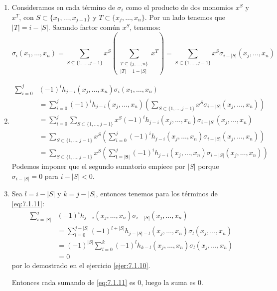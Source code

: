 \documentclass[twoside]{article}
\begin{document}
\begin{solucion}
\mbox{}
\begin{enumerate}
\item Consideramos en cada término de $σ_i$ como el producto de dos monomios $x^S$ y $x^T$, con $S \subset \{x_1,\dots,x_{j-1}\}$ y $T \subset \{x_j,\dots,x_n\}$.
Por un lado tenemos que $|T|=i-|S|$.
Sacando factor común $x^S$, tenemos:
\[ σ_i(x_1,\dots,x_n) = \sum_{S \subseteq \{1,\dots,j-1\}} x^S \left(\sum_{\substack{T \subseteq \{j,\dots,n\}\\|T|=1-|S|}} x^T\right) = \sum_{S \subset \{1,\dots,j-1\}} x^S σ_{i-|S|}(x_j,\dots,x_n) \]

\item
\begin{align*}
\sum_{i=0}^j & (-1)^i h_{j-i}(x_j,\dots,x_n) σ_i(x_1,\dots,x_n)\\
& = \sum_{i=0}^j (-1)^i h_{j-i}(x_j,\dots,x_n) \left(\sum_{S \subset \{1,\dots,j-1\}} x^S σ_{i-|S|}(x_j,\dots,x_n)\right)\\
& = \sum_{i=0}^j \sum_{S \subset \{1,\dots,j-1\}} x^S (-1)^i h_{j-i}(x_j,\dots,x_n) σ_{i-|S|}(x_j,\dots,x_n)\\
& = \sum_{S \subset \{1,\dots,j-1\}} x^S \left(\sum_{i=0}^j (-1)^i h_{j-i}(x_j,\dots,x_n) σ_{i-|S|}(x_j,\dots,x_n)\right)\\
& =  \sum_{S \subset \{1,\dots,j-1\}} x^S \left(\sum_{\mathbf{i=|S|}}^j (-1)^i h_{j-i}(x_j,\dots,x_n) σ_{i-|S|}(x_j,\dots,x_n)\right)
\end{align*}
Podemos imponer que el segundo sumatorio empiece por $|S|$ porque $σ_{i-|S|} = 0$ para $i - |S| < 0$.
\item Sea $l = i - |S|$ y $k = j - |S|$, entonces tenemos para los términos de \eqref{eq:7.1.11}:
\begin{align*}
\sum_{i=|S|}^j & (-1)^i h_{j-i}(x_j,\dots,x_n) σ_{i-|S|}(x_j,\dots,x_n)\\
& = \sum_{l=0}^{j-|S|} (-1)^{l+|S|} h_{j-|S|-l}(x_j,\dots,x_n) σ_{l}(x_j,\dots,x_n)\\
& = (-1)^{|S|}\sum_{l=0}^{k} (-1)^l h_{k-l}(x_j,\dots,x_n) σ_{l}(x_j,\dots,x_n)\\
& = 0
\end{align*}
por lo demostrado en el ejercicio \ref{ejer:7.1.10}.

Entonces cada sumando de \eqref{eq:7.1.11} es $0$, luego la suma es $0$.
\end{enumerate}
\end{solucion}
\newpage
\end{document}
